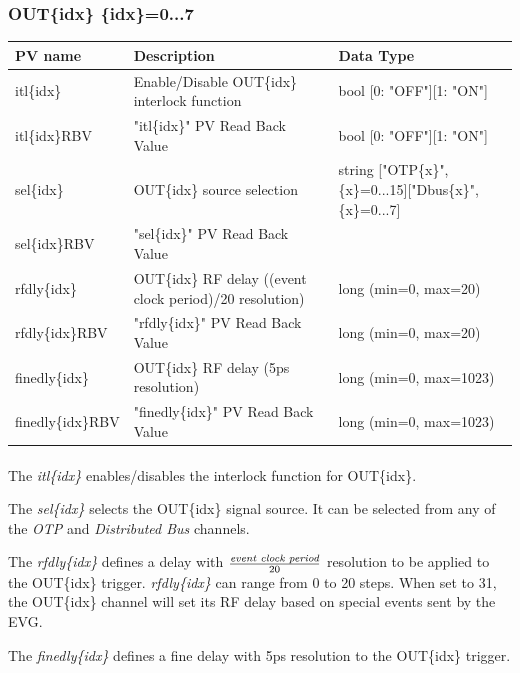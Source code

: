 \documentclass[openany]{article}
\begin{document}
		\subsubsection{OUT\{idx\} \{idx\}=0...7}\label{pvgroup:evre-out}
			\begin{center}
			\begin{tabular}{| m{2.8cm} m{6cm} m{6cm} |}
			    \hline
			    \bfseries PV name & \bfseries Description & \bfseries Data Type \\ \hline
			    itl\{idx\} & Enable/Disable OUT\{idx\} interlock function & bool [0: "OFF"][1: "ON"] \\ \hline
			    itl\{idx\}RBV & "itl\{idx\}" PV Read Back Value & bool [0: "OFF"][1: "ON"] \\ \hline
			    sel\{idx\} & OUT\{idx\} source selection & string ["OTP\{x\}", \{x\}=0...15]["Dbus\{x\}", \{x\}=0...7] \\ \hline
			    sel\{idx\}RBV & "sel\{idx\}" PV Read Back Value &  \\ \hline
			    rfdly\{idx\} & OUT\{idx\} RF delay ((event clock period)/20 resolution) & long (min=0, max=20) \\ \hline
			    rfdly\{idx\}RBV & "rfdly\{idx\}" PV Read Back Value & long (min=0, max=20) \\ \hline
			    finedly\{idx\} & OUT\{idx\} RF delay (5ps resolution) & long (min=0, max=1023) \\ \hline
			    finedly\{idx\}RBV & "finedly\{idx\}" PV Read Back Value & long (min=0, max=1023) \\ \hline 
			\end{tabular}
			\end{center}

			\paragraph{} The \emph{itl\{idx\}} enables/disables the interlock function for OUT\{idx\}.
			\par The \emph{sel\{idx\}} selects the OUT\{idx\} signal source. It can be selected from any of the \emph{OTP} and \emph{Distributed Bus} channels.
			\par The \emph{rfdly\{idx\}} defines a delay with \( \frac{\emph{event clock period}}{20} \) resolution to be applied to the OUT\{idx\} trigger. \emph{rfdly\{idx\}} can range from 0 to 20 steps. When set to 31, the OUT\{idx\} channel will set its RF delay based on special events sent by the EVG.
			\par The \emph{finedly\{idx\}} defines a fine delay with 5ps resolution to the OUT\{idx\} trigger.
\end{document}
